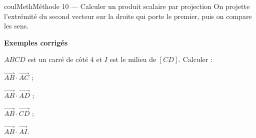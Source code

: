 \documentclass[11pt,a4paper]{article}
\makeatletter
\newcommand{\vect}[1]{\overrightarrow{#1}}
\newcounter{lycee@signet}
\newcommand{\signet}[3][]{\stepcounter{lycee@signet}%
  \edef\lycee@dest{\if\relax\detokenize{#1}\relax
    signet.\arabic{lycee@signet}\else#1\fi}%
  \hypertarget{\lycee@dest}{}\bookmark[level=#2,dest=\lycee@dest]{#3}}
\newcounter{methode}
\newenvironment{methodebox}[1][Méthode]{\stepcounter{methode}%
  \begin{boitecours}[phantom={\signet[methode-\arabic{methode}]{2}{#1}}]{coulMeth}{#1}}%
  {\end{boitecours}}
\newcommand{\etape}[1]{\par\smallskip\textbf{\color{coulMeth}#1}\par\nobreak\smallskip}
\newcommand{\etapeexemples}{\etape{Exemples corrigés}}
\makeatother
\begin{document}
\begin{methodebox}[Méthode 10 --- Calculer un produit scalaire par projection]
On projette l'extrémité du second vecteur sur la droite qui porte le premier, puis on
compare les sens.
\etapeexemples
\begin{minipage}[t]{0.62\linewidth}\raggedright
$ABCD$ est un carré de côté $4$ et $I$ est le milieu de $[CD]$. Calculer :
\begin{questions}[label=\alph*)]
  \item $\vect{AB}\cdot\vect{AC}$ ;
  \item $\vect{AB}\cdot\vect{AD}$ ;
  \item $\vect{AB}\cdot\vect{CD}$ ;
  \item $\vect{AB}\cdot\vect{AI}$.
\end{questions}
\end{minipage}\hfill
\begin{minipage}[t]{0.34\linewidth}
\vspace{0pt}\centering
{}
\end{minipage}


\end{methodebox}
\end{document}
